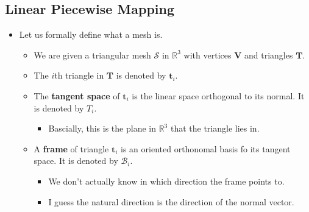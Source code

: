 \documentclass[10pt]{article}
\newcommand{\ve}[1]{\mathbf{#1}}
\newcommand{\mcal}[1]{\mathcal{#1}}
\newcommand{\Real}{\mathbb{R}}
\begin{document}
\subsection{Linear Piecewise Mapping}

\begin{itemize}
    \item Let us formally define what a mesh is.
    \begin{itemize}
        \item We are given a triangular mesh $\mcal{S}$ in $\Real^3$ with vertices $\ve{V}$ and triangles $\ve{T}$.
        \item The $i$th triangle in $\ve{T}$ is denoted by $\ve{t}_i$.
        \item The {\bf tangent space} of $\ve{t}_i$ is the linear space orthogonal to its normal. It is denoted by $T_i$.
        \begin{itemize}
            \item Bascially, this is the plane in $\Real^3$ that the triangle lies in.
        \end{itemize}
        \item A {\bf frame} of triangle $\ve{t}_i$ is an oriented orthonomal basis fo its tangent space. It is denoted by $\mcal{B}_i$.
        \begin{itemize}
            \item We don't actually know in which direction the frame points to.
            \item I guess the natural direction is the direction of the normal vector.            
        \end{itemize}
    \end{itemize}


\end{itemize}
\end{document}
